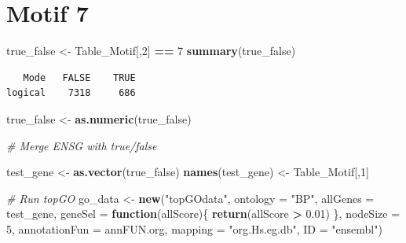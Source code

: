\documentclass[]{article}
\newenvironment{Shaded}{\begin{snugshade}}{\end{snugshade}}
\newcommand{\KeywordTok}[1]{\textcolor[rgb]{0.13,0.29,0.53}{\textbf{#1}}}
\newcommand{\DataTypeTok}[1]{\textcolor[rgb]{0.13,0.29,0.53}{#1}}
\newcommand{\DecValTok}[1]{\textcolor[rgb]{0.00,0.00,0.81}{#1}}
\newcommand{\FloatTok}[1]{\textcolor[rgb]{0.00,0.00,0.81}{#1}}
\newcommand{\StringTok}[1]{\textcolor[rgb]{0.31,0.60,0.02}{#1}}
\newcommand{\CommentTok}[1]{\textcolor[rgb]{0.56,0.35,0.01}{\textit{#1}}}
\newcommand{\ControlFlowTok}[1]{\textcolor[rgb]{0.13,0.29,0.53}{\textbf{#1}}}
\newcommand{\OperatorTok}[1]{\textcolor[rgb]{0.81,0.36,0.00}{\textbf{#1}}}
\newcommand{\NormalTok}[1]{#1}
\begin{document}
\begin{Shaded}
\end{Shaded}

\section{Motif 7}\label{motif-7}

\begin{Shaded}
\begin{Highlighting}[]
\NormalTok{true_false <-}\StringTok{ }\NormalTok{Table_Motif[,}\DecValTok{2}\NormalTok{] }\OperatorTok{==}\StringTok{ }\DecValTok{7}
\KeywordTok{summary}\NormalTok{(true_false)}
\end{Highlighting}
\end{Shaded}

\begin{verbatim}
   Mode   FALSE    TRUE 
logical    7318     686 
\end{verbatim}

\begin{Shaded}
\begin{Highlighting}[]
\NormalTok{true_false <-}\StringTok{ }\KeywordTok{as.numeric}\NormalTok{(true_false)}

\CommentTok{# Merge ENSG with true/false}

\NormalTok{test_gene <-}\StringTok{ }\KeywordTok{as.vector}\NormalTok{(true_false)}
\KeywordTok{names}\NormalTok{(test_gene) <-}\StringTok{ }\NormalTok{Table_Motif[,}\DecValTok{1}\NormalTok{]}

\CommentTok{# Run topGO}
\NormalTok{go_data <-}\StringTok{ }\KeywordTok{new}\NormalTok{(}\StringTok{"topGOdata"}\NormalTok{,}
                   \DataTypeTok{ontology =} \StringTok{"BP"}\NormalTok{,}
                   \DataTypeTok{allGenes =}\NormalTok{ test_gene, }
                    \DataTypeTok{geneSel =} \ControlFlowTok{function}\NormalTok{(allScore)\{}
    \KeywordTok{return}\NormalTok{(allScore }\OperatorTok{>}\StringTok{ }\FloatTok{0.01}\NormalTok{)}
\NormalTok{\},}
                   \DataTypeTok{nodeSize =} \DecValTok{5}\NormalTok{,}
                   \DataTypeTok{annotationFun =}\NormalTok{ annFUN.org,}
                   \DataTypeTok{mapping =} \StringTok{"org.Hs.eg.db"}\NormalTok{,}
                   \DataTypeTok{ID =} \StringTok{"ensembl"}\NormalTok{)}
\end{Highlighting}
\end{Shaded}
\end{document}
